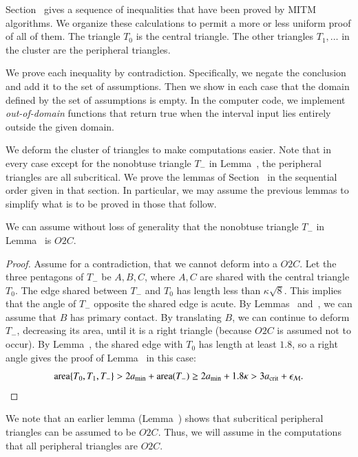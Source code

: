 Section~ gives a sequence of inequalities that have been
proved by MITM algorithms.  We organize these calculations to permit a
more or less uniform proof of all of them.  The triangle $T_0$ is  the
central triangle.  The other triangles $T_1,\ldots$ in the cluster are the
peripheral triangles.

We prove each inequality by contradiction. Specifically, we negate the
conclusion and add it to the set of assumptions.  Then we show in each
case that the domain defined by the set of assumptions is empty. In
the computer code, we implement {\it out-of-domain} functions that
return true when the interval input lies entirely outside the given
domain.

We deform the cluster of triangles to make computations easier.  Note
that in every case except for the nonobtuse triangle $T_-$ in
Lemma~, the peripheral triangles are all
subcritical.  We prove the lemmas of Section~ in the
sequential order given in that section.  In particular, we may
assume the previous lemmas to simplify what is to be proved in those
that follow.

\begin{lemma}
  We can assume without loss of generality that the nonobtuse triangle $T_-$ in
  Lemma~ is $O2C$.
\end{lemma}

\begin{proof} 
  Assume for a contradiction, that we cannot deform into a $O2C$.
  Let
  the three pentagons of $T_-$ be $A,B,C$, where $A,C$ are shared with
  the central triangle $T_0$.
  The edge shared between $T_-$ and $T_0$ has length less than $\kappa\sqrt8$.
  This implies that the angle of $T_-$ opposite the shared edge is acute.
  By Lemmas~
  and~, we can assume that $B$ has primary
  contact.  By translating $B$, we can continue to deform $T_-$,
  decreasing its area, until it is a right triangle (because $O2C$ is
  assumed not to occur).  By Lemma~, the shared edge
  with $T_0$ has length at least $1.8$, so a right angle gives the
  proof of Lemma~ in this case:
\[
{\operatorname{area}}\{T_0,T_1,T_-\} > 2a_\text{min} + {\operatorname{area}}(T_-) 
\ge 2a_\text{min} + 1.8\kappa > 3a_\text{crit} + \epsilon_{\mathcal M}.
\]
\end{proof}

We note that an earlier lemma (Lemma~) shows that
subcritical peripheral triangles can be assumed to be $O2C$. Thus, we
will assume in the computations that all peripheral triangles are
$O2C$.

